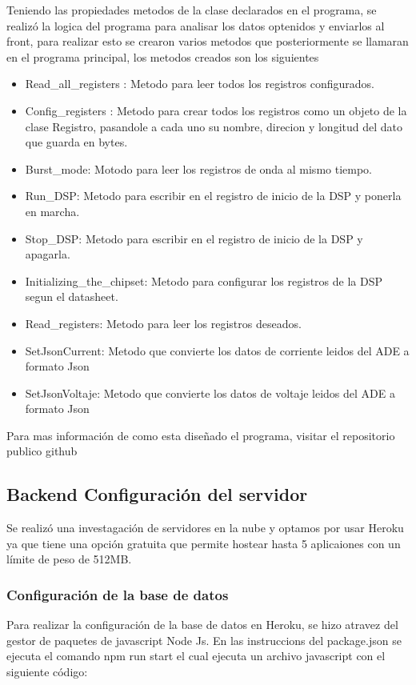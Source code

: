             Teniendo las propiedades  metodos de la clase declarados en el programa, se realizó la logica del programa para analisar los datos optenidos y enviarlos al front, para realizar esto se crearon varios metodos que posteriormente se llamaran en el programa principal, los metodos creados son los siguientes
            \begin{itemize}
                \item Read\_all\_registers : Metodo para leer todos los registros configurados.
                \item Config\_registers : Metodo para crear todos los registros como un objeto de la clase Registro, pasandole a cada uno su nombre, direcion y longitud del dato que guarda en bytes.
                \item Burst\_mode: Motodo para leer los registros de onda al mismo tiempo.
                \item Run\_DSP: Metodo para escribir en el registro de inicio de la DSP y ponerla en marcha.
                \item Stop\_DSP: Metodo para escribir en el registro de inicio de la DSP y apagarla.
                \item Initializing\_the\_chipset: Metodo para configurar los registros de la DSP segun el datasheet.
                \item Read\_registers: Metodo para leer los registros deseados.
                \item SetJsonCurrent: Metodo que convierte los datos de corriente leidos del ADE a formato Json
                \item SetJsonVoltaje: Metodo que convierte los datos de voltaje leidos del ADE a formato Json
            \end{itemize}

            Para mas información de como esta diseñado el programa, visitar el repositorio publico github \cite{A41}
    \subsection{Backend Configuración del servidor}
        Se realizó una investagación de servidores en la nube y optamos por usar Heroku ya que tiene una opción gratuita que permite hostear hasta 5 aplicaiones con un límite de peso de 512MB. 
        \subsubsection{Configuraci\'on de la base de datos}
            Para realizar la configuración de la base de datos en Heroku, se hizo atravez del gestor de paquetes de javascript Node Js. En las instruccions del package.json se ejecuta el comando npm run start el cual ejecuta un archivo javascript con el siguiente código:

